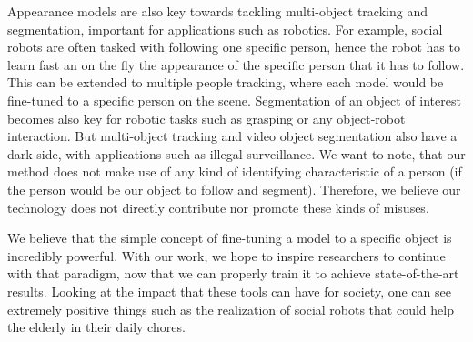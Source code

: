 \documentclass{article}
\begin{document}
Appearance models are also key towards tackling multi-object tracking and segmentation, important for applications such as robotics.
For example, social robots are often tasked with following one specific person, hence the robot has to learn fast an on the fly the appearance of the specific person that it has to follow.
This can be extended to multiple people tracking, where each model would be fine-tuned to a specific person on the scene.
Segmentation of an object of interest becomes also key for robotic tasks such as grasping or any object-robot interaction.
But multi-object tracking and video object segmentation also have a dark side, with applications such as illegal surveillance. We want to note, that our method does not make use of any kind of identifying characteristic of a person (if the person would be our object to follow and segment).
Therefore, we believe our technology does not directly contribute nor promote these kinds of misuses.


We believe that the simple concept of fine-tuning a model to a specific object is incredibly powerful. With our work, we hope to inspire researchers to continue with that paradigm, now that we can properly train it to achieve state-of-the-art results.
Looking at the impact that these tools can have for society, one can see extremely positive things such as the realization of social robots that could help the elderly in their daily chores.
 \clearpage


 
\end{document}
